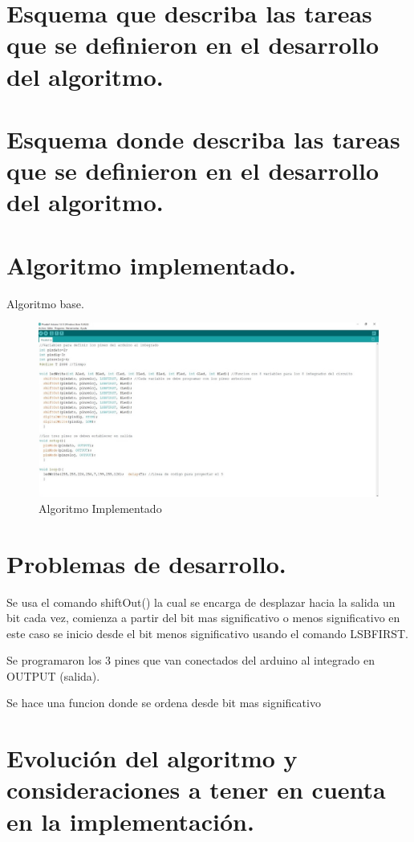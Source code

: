 \documentclass{article}
\begin{document}
\section{Esquema que describa las tareas que se definieron en el desarrollo del algoritmo.}\label{intro}



\section{Esquema donde describa las tareas que se definieron en el desarrollo del algoritmo.}\label{intro}

\newpage
\section{Algoritmo implementado.}\label{intro}
Algoritmo base.
\begin{figure}[h]
\includegraphics[width=12cm]{Algoritmo.jpeg}
\centering
\caption{Algoritmo Implementado}
\label{fig:Algoritmo}
\end{figure}




\section{Problemas de desarrollo.}\label{intro}

Se usa el comando shiftOut() la cual se encarga de desplazar hacia la salida un bit cada vez, comienza a partir del bit mas significativo o menos significativo en este caso se inicio desde el bit  menos significativo usando el comando LSBFIRST.

Se programaron los 3 pines que van conectados del arduino al integrado en OUTPUT (salida).

Se hace una funcion donde se ordena desde bit mas significativo 

\section{Evolución del algoritmo y consideraciones a tener en cuenta en la implementación.}\label{intro}
\end{document}
